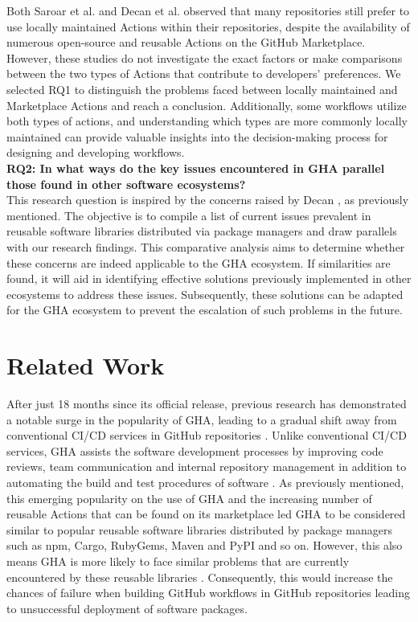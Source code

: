 \documentclass[conference]{IEEEtran}
\begin{document}
    Both Saroar et al. \cite{saroar2023developers} and Decan et al. \cite{decan2022use} observed that many repositories still prefer to use locally maintained Actions within their repositories, despite the availability of numerous open-source and reusable Actions on the GitHub Marketplace. However, these studies do not investigate the exact factors or make comparisons between the two types of Actions that contribute to developers' preferences. We selected RQ1 to distinguish the problems faced between locally maintained and Marketplace Actions and reach a conclusion. Additionally, some workflows utilize both types of actions, and understanding which types are more commonly locally maintained can provide valuable insights into the decision-making process for designing and developing workflows. \\

 \textbf{RQ2: In what ways do the key issues encountered in GHA parallel those found in other software ecosystems?}\\

    This research question is inspired by the concerns raised by Decan \cite{decan2022use}, as previously mentioned. The objective is to compile a list of current issues prevalent in reusable software libraries distributed via package managers and draw parallels with our research findings. This comparative analysis aims to determine whether these concerns are indeed applicable to the GHA ecosystem. If similarities are found, it will aid in identifying effective solutions previously implemented in other ecosystems to address these issues. Subsequently, these solutions can be adapted for the GHA ecosystem to prevent the escalation of such problems in the future.




\section{Related Work}
    After just 18 months since its official release, previous research has demonstrated a notable surge in the popularity of GHA, leading to a gradual shift away from conventional CI/CD services in GitHub repositories \cite{golzadeh2021rise}. Unlike conventional CI/CD services, GHA assists the software development processes by improving code reviews, team communication and internal repository management in addition to automating the build and test procedures of software \cite{chandrasekara2021hands}. As previously mentioned, this emerging popularity on the use of GHA and the increasing number of reusable Actions that can be found on its marketplace led GHA to be considered similar to popular reusable software libraries distributed by package managers such as npm, Cargo, RubyGems, Maven and PyPI and so on. However, this also means GHA is more likely to face similar problems that are currently encountered by these reusable libraries \cite{decan2022use}. Consequently, this would increase the chances of failure when building GitHub workflows in GitHub repositories leading to unsuccessful deployment of software packages. \\
\end{document}
